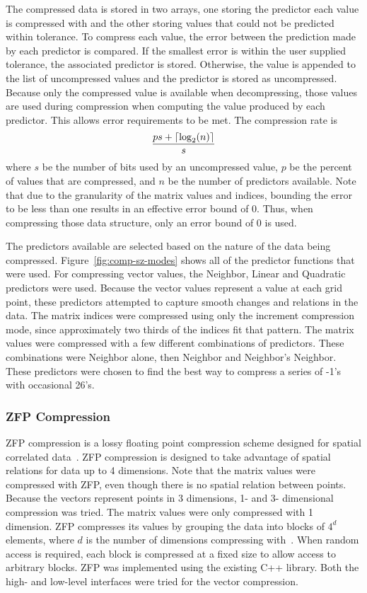 The compressed data is stored in two arrays, one storing the predictor each value is compressed with and the other storing values that could not be predicted within tolerance.
To compress each value, the error between the prediction made by each predictor is compared.
If the smallest error is within the user supplied tolerance, the associated predictor is stored.
Otherwise, the value is appended to the list of uncompressed values and the predictor is stored as uncompressed.
Because only the compressed value is available when decompressing, those values are used during compression when computing the value produced by each predictor.
This allows error requirements to be met.
The compression rate is
\[
	\frac{ps+\lceil\log_2(n)\rceil}{s}
\]
where \(s\) be the number of bits used by an uncompressed value, \(p\) be the percent of values that are compressed, and \(n\) be the number of predictors available.
Note that due to the granularity of the matrix values and indices, bounding the error to be less than one results in an effective error bound of 0.
Thus, when compressing those data structure, only an error bound of 0 is used.



The predictors available are selected based on the nature of the data being compressed.
Figure~\ref{fig:comp-sz-modes} shows all of the predictor functions that were used.
For compressing vector values, the Neighbor, Linear and Quadratic predictors were used.
Because the vector values represent a value at each grid point, these predictors attempted to capture smooth changes and relations in the data.
The matrix indices were compressed using only the increment compression mode, since approximately two thirds of the indices fit that pattern.
The matrix values were compressed with a few different combinations of predictors.
These combinations were Neighbor alone, then Neighbor and Neighbor's Neighbor.
These predictors were chosen to find the best way to compress a series of -1's with occasional 26's.

\subsubsection{ZFP Compression}
ZFP compression is a lossy floating point compression scheme designed for spatial correlated data~\cite{Lindstrom:2014:zfp}.
ZFP compression is designed to take advantage of spatial relations for data up to 4 dimensions.
Note that the matrix values were compressed with ZFP, even though there is no spatial relation between points.
Because the vectors represent points in 3 dimensions, 1- and 3- dimensional compression was tried.
The matrix values were only compressed with 1 dimension.
ZFP compresses its values by grouping the data into blocks of \(4^d\) elements, where \(d\) is the number of dimensions compressing with~\cite{Lindstrom:2014:zfp}.
When random access is required, each block is compressed at a fixed size to allow access to arbitrary blocks.
ZFP was implemented using the existing C++ library.
Both the high- and low-level interfaces were tried for the vector compression.


